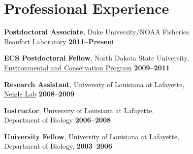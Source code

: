 \documentclass[letterpaper]{article}
\renewenvironment{itemize}{
  \begin{list}{}{
    \setlength{\leftmargin}{1em}
  }
}{
  \end{list}
}
\begin{document}
\section*{Professional Experience}
  \begin{itemize}
			\item \textbf{Postdoctoral Associate}, Duke University/NOAA Fisheries \\
      Beaufort Laboratory \hfill\textbf{2011--Present}

			\item \textbf{ECS Postdoctoral Fellow}, North Dakota State University, \\
			\href{http://www.ndsu.edu/ecs/}{Environmental and Conservation Program} \hfill\textbf{2009--2011}

			\item \textbf{Research Assistant}, University of Louisiana at Lafayette,  \\
      \href{http://seahorse.louisiana.edu/}{Neigle Lab} \hfill\textbf{2008--2009} 
      
			\item \textbf{Instructor}, University of Louisiana at Lafayette, \\
      Department of Biology \hfill\textbf{2006--2008} 
      
			\item \textbf{University Fellow}, University of Louisiana at Lafayette, \\
      Department of Biology, \hfill\textbf{2003--2006}
      
	\end{itemize}

 
\end{document}
